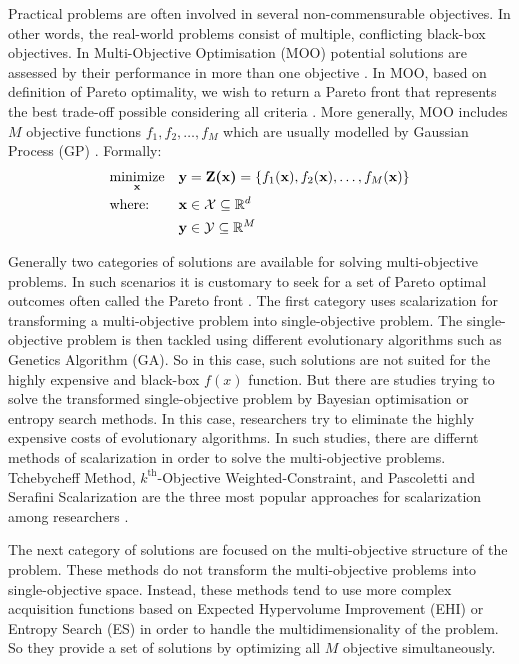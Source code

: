 Practical problems are often involved in several non-commensurable objectives. In other words, the real-world problems consist of multiple, conflicting black-box objectives. In Multi-Objective Optimisation (MOO) potential solutions are assessed  by their performance in more than one objective \cite{couckuyt2014fast}. In MOO, based on definition of Pareto optimality, we wish to return a Pareto front that represents the best trade-off  possible considering all criteria \cite{calandra2014pareto}.  More generally, MOO includes $M$ objective functions $f_1, f_2, \ldots, f_M$ which are usually modelled by Gaussian Process (GP) \cite{rasmussen2006gaussian}. Formally:
\begin{equation*}
\begin{aligned}
& \underset{\textbf{x}}{\text{minimize}}
& & \textbf{y}=\textbf{Z(x)}=\{f_1(\textbf{x}),f_2(\textbf{x}), \ldots,f_M(\textbf{x})\} \\
& \text{where:}
& & {\textbf x} \in \mathcal{X} \subseteq \mathbb{R}^d\\
& \text{}
& & {\textbf y} \in \mathcal{Y} \subseteq \mathbb{R}^M\\
\end{aligned}
\end{equation*}
\par
Generally two categories of solutions are available for solving multi-objective problems. In such scenarios it is customary to seek for a set of Pareto optimal outcomes often called the Pareto front \cite{couckuyt2014fast}. The first category uses scalarization for transforming a multi-objective problem into single-objective problem. The single-objective problem is then tackled using different evolutionary algorithms such as Genetics Algorithm (GA). So in this case, such solutions are not suited for the highly expensive and black-box $f(x)$ function. But there are studies trying to solve the transformed single-objective problem by Bayesian optimisation or entropy search methods. In this case, researchers try to eliminate the highly expensive costs of evolutionary algorithms. In such studies, there are differnt methods of scalarization in order to solve the multi-objective problems. Tchebycheff Method, $k^{\text{th}}$-Objective Weighted-Constraint, and  Pascoletti and Serafini Scalarization are the three most popular approaches for scalarization among researchers \cite{pardalos2017non}.
\par
The next category of solutions are focused on the multi-objective structure of the problem. These methods do not transform the multi-objective problems into single-objective space. Instead, these methods tend to use more complex acquisition functions based on Expected Hypervolume Improvement (EHI) or Entropy Search (ES) in order to handle the multidimensionality of the problem. So they provide a set of solutions by optimizing all $M$ objective simultaneously.  

